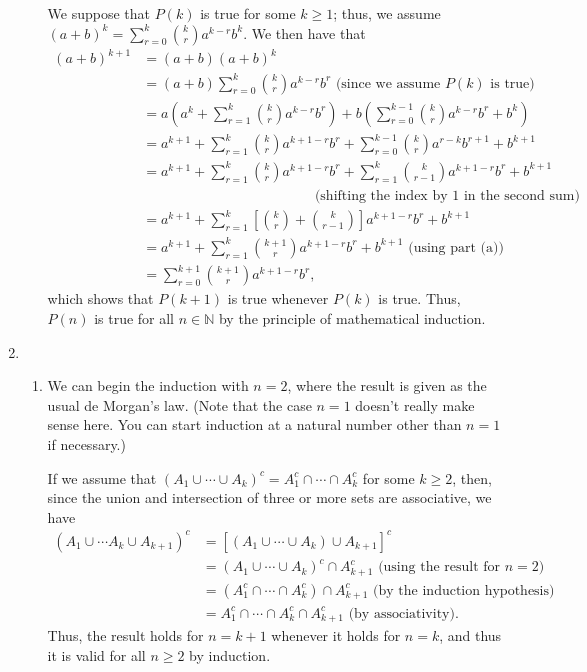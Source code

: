 \documentclass[12pt,letterpaper]{article}
\begin{document}
\begin{enumerate}
\begin{enumerate}
We suppose that $P(k)$ is true for some $k\geq 1$; thus, we assume $(a+b)^k = \sum_{r=0}^k\binom{k}{r}a^{k-r}b^k$. We then have that
\begin{align*}
(a+b)^{k+1} & = (a+b)(a+b)^k\\
& = (a+b)\sum_{r=0}^k\binom{k}{r}a^{k-r}b^r \text{ (since we assume } P(k) \text{ is true)}\\
& = a\left(a^k+\sum_{r=1}^k\binom{k}{r}a^{k-r}b^r\right)+b\left(\sum_{r=0}^{k-1}\binom{k}{r}a^{k-r}b^r+b^k\right)\\
& = a^{k+1}+\sum_{r=1}^k\binom{k}{r}a^{k+1-r}b^r+\sum_{r=0}^{k-1}\binom{k}{r}a^{r-k}b^{r+1} + b^{k+1}\\
& = a^{k+1}+\sum_{r=1}^k\binom{k}{r}a^{k+1-r}b^r+\sum_{r=1}^{k}\binom{k}{r-1}a^{k+1-r}b^{r} + b^{k+1}\\
&\hspace{2in} \text{ (shifting the index by 1 in the second sum)}\\
& = a^{k+1}+\sum_{r=1}^k\left[\binom{k}{r}+\binom{k}{r-1}\right]a^{k+1-r}b^r+b^{k+1}\\
& = a^{k+1}+\sum_{r=1}^k\binom{k+1}{r}a^{k+1-r}b^r + b^{k+1} \text{ (using part (a))}\\
& = \sum_{r=0}^{k+1}\binom{k+1}{r}a^{k+1-r}b^r,
\end{align*}
which shows that $P(k+1)$ is true whenever $P(k)$ is true. Thus, $P(n)$ is true for all $n\in\mathbb{N}$ by the principle of mathematical induction.
\end{enumerate}
\item \begin{enumerate}
\item We can begin the induction with $n=2$, where the result is given as the usual de Morgan's law. (Note that the case $n=1$ doesn't really make sense here. You can start induction at a natural number other than $n=1$ if necessary.)

If we assume that $(A_1\cup \cdots \cup A_k)^c = A_1^c\cap \cdots \cap A_k^c$ for some $k\geq 2$, then, since the union and intersection of three or more sets are associative, we have
\begin{align*}
(A_1\cup\cdots A_k\cup A_{k+1})^c & = \left[(A_1\cup\cdots\cup A_k)\cup A_{k+1}\right]^c\\
& = (A_1\cup\cdots\cup A_k)^c\cap A_{k+1}^c \text{ (using the result for $n=2$)}\\
& = (A_1^c\cap\cdots\cap A_k^c)\cap A_{k+1}^c \text{ (by the induction hypothesis)}\\
& = A_1^c\cap\cdots \cap A_k^c\cap A_{k+1}^c \text{ (by associativity)}.
\end{align*}
Thus, the result holds for $n=k+1$ whenever it holds for $n=k$, and thus it is valid for all $n\geq 2$ by induction.


\end{enumerate}
\end{enumerate}
\end{document}
